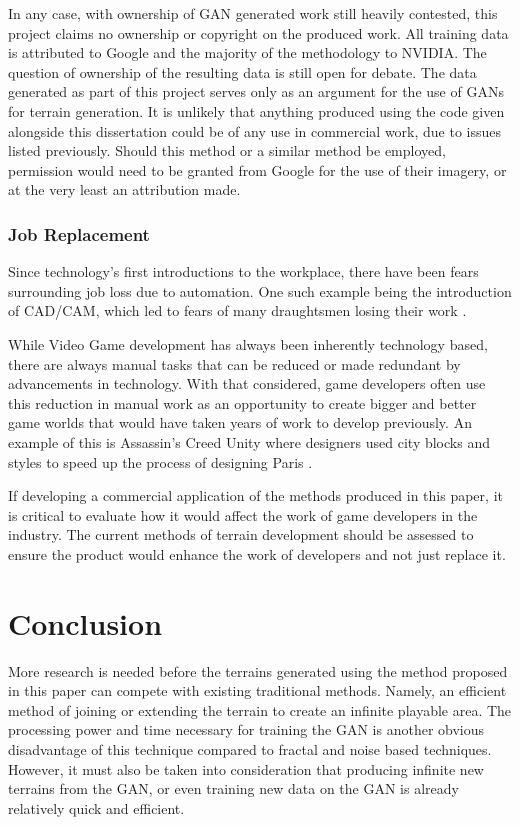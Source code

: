 \documentclass[a4paper]{report}
\begin{document}
In any case, with ownership of GAN generated work still heavily contested, this project claims no ownership or copyright on the produced work. All training data is attributed to Google and the majority of the methodology to NVIDIA. The question of ownership of the resulting data is still open for debate. The data generated as part of this project serves only as an argument for the use of GANs for terrain generation. It is unlikely that anything produced using the code given alongside this dissertation could be of any use in commercial work, due to issues listed previously. Should this method or a similar method be employed, permission would need to be granted from Google for the use of their imagery, or at the very least an attribution made.

\subsubsection{Job Replacement}
Since technology's first introductions to the workplace, there have been fears surrounding job loss due to automation. One such example being the introduction of CAD/CAM, which led to fears of many draughtsmen losing their work \cite{cad}.

While Video Game development has always been inherently technology based, there are always manual tasks that can be reduced or made redundant by advancements in technology. With that considered, game developers often use this reduction in manual work as an opportunity to create bigger and better game worlds that would have taken years of work to develop previously. An example of this is Assassin's Creed Unity where designers used city blocks and styles to speed up the process of designing Paris \cite{ign_2014}.

If developing a commercial application of the methods produced in this paper, it is critical to evaluate how it would affect the work of game developers in the industry. The current methods of terrain development should be assessed to ensure the product would enhance the work of developers and not just replace it.

\section{Conclusion}
More research is needed before the terrains generated using the method proposed in this paper can compete with existing traditional methods. Namely, an efficient method of joining or extending the terrain to create an infinite playable area. The processing power and time necessary for training the GAN is another obvious disadvantage of this technique compared to fractal and noise based techniques. However, it must also be taken into consideration that producing infinite new terrains from the GAN, or even training new data on the GAN is already relatively quick and efficient.
\end{document}
